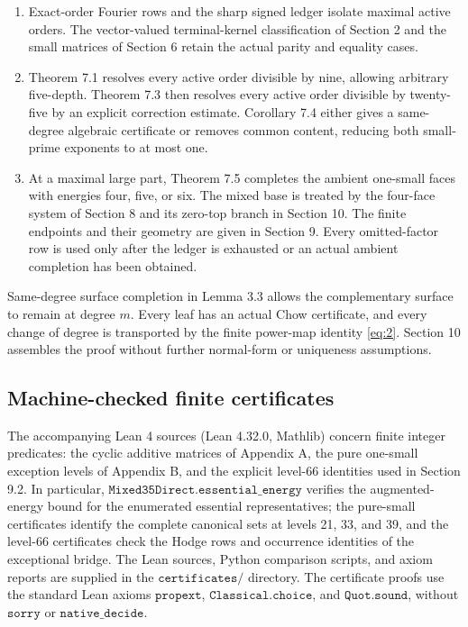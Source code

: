 \documentclass[11pt]{amsart}
\numberwithin{theorem}{section}
\theoremstyle{remark}
\numberwithin{equation}{section}
\providecommand{\tightlist}{\setlength{\itemsep}{0pt}\setlength{\parskip}{0pt}}
\begin{document}
\begin{enumerate}[label=\arabic*.,leftmargin=*]\tightlist
\item Exact-order Fourier rows and the sharp signed ledger isolate maximal
active orders. The vector-valued terminal-kernel classification of
Section 2 and the small matrices of Section 6 retain the actual
parity and equality cases.
\item Theorem 7.1 resolves every active order divisible by nine, allowing
arbitrary five-depth. Theorem 7.3 then resolves every active order
divisible by twenty-five by an explicit correction estimate.
Corollary 7.4 either gives a same-degree algebraic certificate or
removes common content, reducing both small-prime exponents to at
most one.
\item At a maximal large part, Theorem 7.5 completes the ambient one-small
faces with energies four, five, or six. The mixed base is treated
by the four-face system of Section 8 and its zero-top branch in
Section 10. The finite endpoints and their geometry are given in
Section 9. Every omitted-factor row is used only after the ledger
is exhausted or an actual ambient completion has been obtained.
\end{enumerate}

Same-degree surface completion in Lemma 3.3 allows the complementary
surface to remain at degree \(m\). Every leaf has an actual Chow
certificate, and every change of degree is transported by the finite
power-map identity \eqref{eq:2}. Section 10 assembles the proof without further
normal-form or uniqueness assumptions.

\subsection{Machine-checked finite certificates}\label{sec:1.3}

The accompanying Lean 4 sources (Lean 4.32.0, Mathlib) concern finite
integer predicates: the cyclic additive matrices of Appendix A, the
pure one-small exception levels of Appendix B, and the explicit
level-66 identities used in Section 9.2. In particular,
\(\texttt{Mixed35Direct.essential\_energy}\) verifies the
augmented-energy bound for the enumerated essential representatives;
the pure-small certificates identify the complete canonical sets at
levels 21, 33, and 39, and the level-66 certificates check the Hodge
rows and occurrence identities of the exceptional bridge. The Lean
sources, Python comparison scripts, and axiom reports are supplied in
the \(\texttt{certificates/}\) directory. The certificate proofs use
the standard Lean axioms \(\texttt{propext}\),
\(\texttt{Classical.choice}\), and \(\texttt{Quot.sound}\), without
\(\texttt{sorry}\) or \(\texttt{native\_decide}\).
\end{document}
